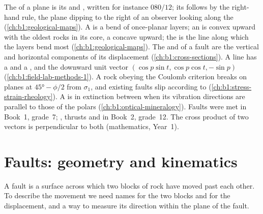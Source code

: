 \begin{recall}
The  of a plane is its  and , written for instance
$080/12$; its  follows by the right-hand rule, the plane dipping to the
right of an observer looking along the  (\cref{ch:b1:geological-maps}).
A  is a bend of once-planar layers; an  is convex upward with
the oldest rocks in its core, a  concave upward; the  is the
line along which the layers bend most (\cref{ch:b1:geological-maps}). The
 and  of a fault are the vertical and horizontal components of its
displacement (\cref{ch:b1:cross-sections}). A line has a  and a ,
and the downward unit vector $(\cos p\sin t, \cos p\cos t, -\sin p)$
(\cref{ch:b1:field-lab-methods-1}). A rock obeying the Coulomb criterion
breaks on planes at $\ang{45} - \phi/2$ from $\sigma_1$, and existing faults
slip according to  (\cref{ch:b1:stress-strain-rheology}). A
 is in extinction between  when its vibration directions
are parallel to those of the polars (\cref{ch:b1:optical-mineralogy}). Faults
were met in Book~1, grade~7; , thrusts and  in Book~2,
grade~12. The cross product of two vectors is perpendicular to both
(mathematics, Year~1).
\end{recall}

\section{Faults: geometry and kinematics}\label{sec:b1:faults-folds-fabrics:faults}

A fault is a surface across which two blocks of rock have moved past each
other. To describe the movement we need names for the two blocks and for the
displacement, and a way to measure its direction within the plane of the
fault.


